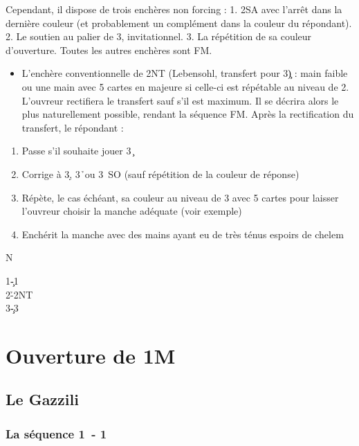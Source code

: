 \documentclass[a4paper]{article}
\begin{document}
Cependant, il dispose de trois enchères non forcing :
1. 2SA avec l'arrêt dans la dernière couleur (et probablement un complément dans la couleur du répondant).
2. Le soutien au palier de 3, invitationnel.
3. La répétition de sa couleur d'ouverture.
Toutes les autres enchères sont FM.

\begin{itemize}
\item L'enchère conventionnelle de 2NT (Lebensohl, transfert pour 3\c ) : main faible ou une main avec 5 cartes en majeure si celle-ci est répétable au niveau de 2.
L'ouvreur rectifiera le transfert sauf s'il est maximum. Il se décrira alors le plus naturellement possible, rendant la séquence FM.
Après la rectification du transfert, le répondant :

\end{itemize}

\begin{enumerate}
\item Passe s'il souhaite jouer 3\c\ 

\item Corrige à 3\d , 3\h\ ou 3\s\ SO (sauf répétition de la couleur de réponse)

\item Répète, le cas échéant, sa couleur au niveau de 3 avec 5 cartes pour laisser l'ouvreur choisir la manche adéquate (voir exemple)

\item Enchérit la manche avec des mains ayant eu de très ténus espoirs de chelem

\end{enumerate}

\dealdiagramenw
{}
{}
{}
{N}

\begin{bidtable}
1\c-1\s\\
2\h-2NT\\
3\c-3\s
\end{bidtable}

\section{Ouverture de 1M}

\subsection{Le Gazzili}

\subsubsection{La séquence 1\pdfh\ - 1\pdfs}
\end{document}
